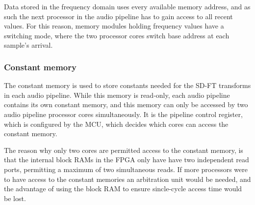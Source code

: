 Data stored in the frequency domain uses every available memory address, and as
such the next processor in the audio pipeline has to gain access to all recent
values. For this reason, memory modules holding frequency values have a
switching mode, where the two processor cores switch base address at each
sample's arrival.

\subsubsection{Constant memory}
The constant memory is used to store constants needed for the SD-FT transforms
in each audio pipeline. While this memory is read-only, each audio pipeline
contains its own constant memory, and this memory can only be accessed by two
audio pipeline processor cores simultaneously. It is the pipeline control
register, which is configured by the MCU, which decides which cores can access
the constant memory.

The reason why only two cores are permitted access to the constant memory, is
that the internal block RAMs in the FPGA only have have two independent
read ports, permitting a maximum of two simultaneous reads. If more processors
were to have access to the constant memories an arbitration unit would be
needed, and the advantage of using the block RAM to ensure sincle-cycle access
time would be lost.
